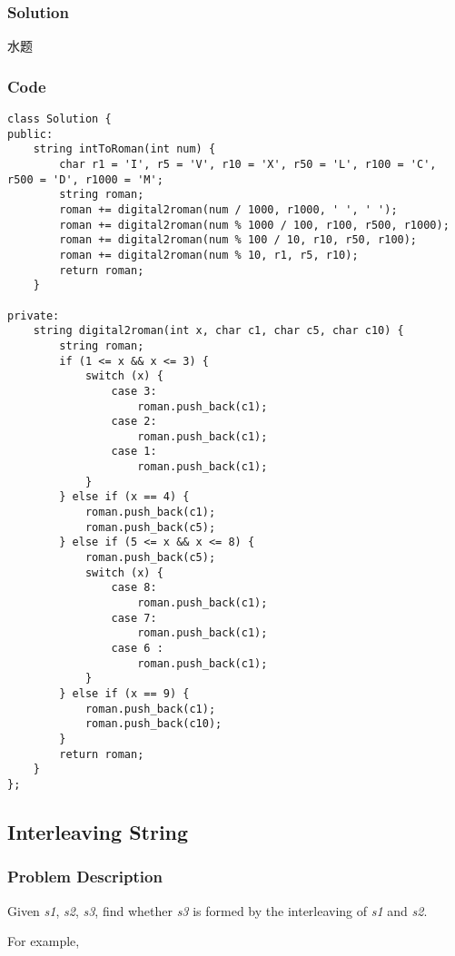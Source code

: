 \documentclass{article}
\begin{document}
\begin{CJK*}{UTF8}{gkai}
\subsubsection*{Solution}
水题

\subsubsection*{Code}
\begin{lstlisting}
class Solution {
public:
    string intToRoman(int num) {
        char r1 = 'I', r5 = 'V', r10 = 'X', r50 = 'L', r100 = 'C', r500 = 'D', r1000 = 'M';
        string roman;
        roman += digital2roman(num / 1000, r1000, ' ', ' ');
        roman += digital2roman(num % 1000 / 100, r100, r500, r1000);
        roman += digital2roman(num % 100 / 10, r10, r50, r100);
        roman += digital2roman(num % 10, r1, r5, r10);
        return roman;
    }
    
private:
    string digital2roman(int x, char c1, char c5, char c10) {
        string roman;
        if (1 <= x && x <= 3) {
            switch (x) {
                case 3:
                    roman.push_back(c1);
                case 2:
                    roman.push_back(c1);
                case 1:
                    roman.push_back(c1);
            }
        } else if (x == 4) {
            roman.push_back(c1);
            roman.push_back(c5);
        } else if (5 <= x && x <= 8) {
            roman.push_back(c5);
            switch (x) {
                case 8:
                    roman.push_back(c1);
                case 7:
                    roman.push_back(c1);
                case 6 :
                    roman.push_back(c1);
            }
        } else if (x == 9) {
            roman.push_back(c1);
            roman.push_back(c10);
        }
        return roman;
    }
}; 
\end{lstlisting}


\subsection{ Interleaving String }
\label{ Interleaving String }

\subsubsection*{Problem Description}
Given \emph{s1}, \emph{s2}, \emph{s3}, find whether \emph{s3} is formed by the interleaving of \emph{s1} and \emph{s2}.

For example,



\end{CJK*}
\end{document}
